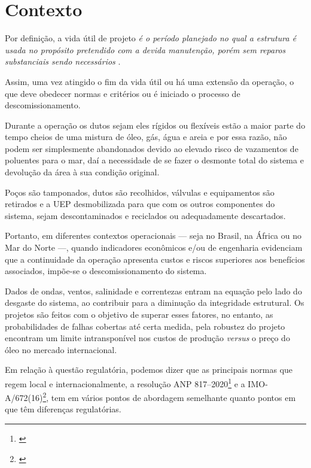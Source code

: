 \documentclass[a4paper,12pt]{article}
\begin{document}
\section{Contexto}
Por definição, a vida útil de projeto \emph{é o período planejado no qual a estrutura é usada no propósito pretendido com a devida manutenção,
porém sem reparos substanciais sendo necessários} \cite{ISO19902_2020}.

Assim, uma vez atingido o fim da vida útil ou há uma extensão da operação, o que deve obedecer normas e critérios ou é iniciado o processo de descomissionamento.

Durante a operação os dutos sejam eles rígidos ou flexíveis estão a maior parte do tempo cheios de uma mistura de óleo, gás, água e areia e por essa razão, não podem ser simplesmente abandonados devido ao elevado risco de vazamentos de poluentes para o mar, daí a necessidade de se fazer o desmonte total do sistema e devolução da área à sua condição original.

Poços são tamponados, dutos são recolhidos, válvulas e equipamentos são retirados e a UEP desmobilizada para que com os outros componentes do sistema, sejam descontaminados e reciclados ou adequadamente descartados. 

Portanto, em diferentes contextos operacionais — seja no Brasil, na África ou no Mar do Norte —, quando indicadores econômicos e/ou de engenharia evidenciam que a continuidade da operação apresenta custos e riscos superiores aos benefícios associados, impõe-se o descomissionamento do sistema.

Dados de ondas, ventos, salinidade e correntezas entram na equação pelo lado do desgaste do sistema, ao contribuir para a diminução da integridade estrutural. Os projetos são feitos com o objetivo de superar esses fatores, no entanto, as probabilidades de falhas  cobertas até certa medida, pela robustez do projeto encontram um limite intransponível nos custos de produção \emph{versus} o preço do óleo no mercado internacional.

Em relação à questão regulatória, podemos dizer que as principais normas que regem local e internacionalmente, a resolução ANP 817--2020\footnote{\cite{ANP_Resolucao_817_2020}} e a IMO-A/672(16)\footnote{\cite{IMO_A672_16_1989}}, tem em vários pontos de abordagem semelhante quanto pontos em que têm diferenças regulatórias. 







\end{document}
